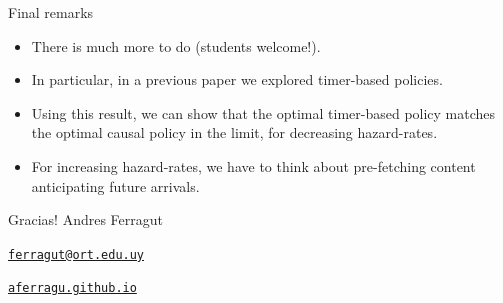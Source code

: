 \documentclass[aspectratio=169]{beamer}
\newenvironment*{myitem}[1][1.5em]{\begin{itemize}\setlength{\itemsep}{#1}}{\end{itemize}}
\begin{document}
\begin{frame}{Final remarks}
	
	\begin{myitem}[2em]
		\item There is much more to do (students welcome!).
		
		\item In particular, in a previous paper we explored \alert{timer-based} policies.
		
		\item Using this result, we can show that the optimal timer-based policy matches the optimal causal policy in the limit, for decreasing hazard-rates.
		
		\item For increasing hazard-rates, we have to think about \alert{pre-fetching} content anticipating future arrivals.
	\end{myitem}
\end{frame}

\begin{frame}[plain]
	\vfill
	{\Huge \alert{Gracias!}}
	\vfill
	Andres Ferragut

	\href{mailto://ferragut@ort.edu.uy}{\alert{\texttt{ferragut@ort.edu.uy}}}
	
	\href{http://aferragu.github.io}{\alert{\texttt{aferragu.github.io}}}
\end{frame}
\end{document}

